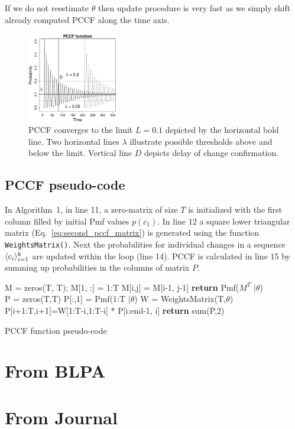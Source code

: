 If we do not reestimate $\theta$ then update procedure is very fast as we simply shift already computed PCCF along the time axis.
\begin{figure}[htb!]
\centering
\includegraphics[width=0.35\textwidth]{articles/pics/sdm_paper/PCCF.pdf}
\caption{PCCF converges to the limit $L = 0.1$ depicted by the horizontal bold line.
Two horizontal lines $\lambda$ illustrate possible thresholds above and below the limit.
Vertical line $D$ depicts delay of change confirmation.
}
\label{fig:conffunction}
\end{figure}


\subsection{PCCF pseudo-code}
\label{subsec:pccf_pseudo_code}
In Algorithm~1, in line 11,  a zero-matrix of size $T$ is initialized with the first column filled by initial Pmf values $p(c_1)$.
In line 12 a square lower triangular matrix (Eq.~\ref{eq:second_pccf_matrix}) is generated using the function {\tt WeightsMatrix()}.
Next the probabilities for individual changes in a sequence
$\langle  c_i  \rangle_{i=1}^k$
are updated within the loop (line 14).
PCCF is calculated in line 15 by summing up probabilities in the columns of matrix $P$.
\begin{algorithm}
    \label{alg:pccfalg}
\begin{algorithmic}[1]
    \State M = zeros(T, T);  M[1, :] = 1:T
			\State M[i,j] = M[i-1, j-1]
		\EndFor
	\EndFor
	\State \textbf{return} Pmf($M^T$ $| \theta$)
\EndFunction
\\
\State P = zeros(T,T)
\State P[:,1] = Pmf(1:T $| \theta$) 
\State W = WeightsMatrix(T,$\theta$)
	\State P[i+1:T,i+1]=W[1:T-i,1:T-i] * P[i:end-1, i]
\EndFor
\State \textbf{return} sum(P,2) 
\EndFunction
\end{algorithmic}
\caption{PCCF function pseudo-code}
\end{algorithm}



\section{From BLPA}

\section{From Journal}


